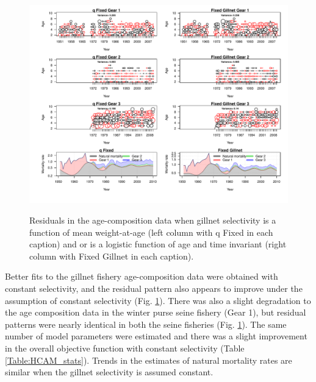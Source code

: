 \begin{figure}[!tbp]
	\includegraphics[width=\textwidth]{../FIGS/iscam_fig_HCAM_Ares_qFix_GillFix.pdf}\\
	\caption{Residuals in the age-composition data when gillnet selectivity is a function of mean weight-at-age (left column with q Fixed in each caption) and or is a logistic function of age and time invariant (right column with Fixed Gillnet in each caption).}\label{fig:qFix_GillFix}
\end{figure}

Better fits to the gillnet fishery age-composition data were obtained with  constant selectivity, and the residual pattern also appears to improve under the assumption of constant selectivity (Fig. \ref{fig:qFix_GillFix}).  There was also a slight degradation to the age composition data in the winter purse seine fishery (Gear 1), but residual patterns were nearly identical in both the seine fisheries (Fig. \ref{fig:qFix_GillFix}).  The same number of model parameters were estimated and there was a slight improvement in the overall objective function with constant selectivity (Table \ref{Table:HCAM_stats}).  Trends in the estimates of natural mortality rates are similar when the gillnet selectivity is assumed constant.


	
	
